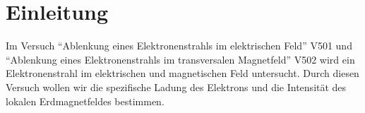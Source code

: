 \section{Einleitung}

Im Versuch \enquote{Ablenkung eines Elektronenstrahls im elektrischen Feld} V501 und \enquote{Ablenkung eines Elektronenstrahls im transversalen Magnetfeld} V502 wird ein Elektronenstrahl im elektrischen und magnetischen Feld untersucht. Durch diesen Versuch wollen wir die spezifische Ladung des Elektrons und die Intensität des lokalen Erdmagnetfeldes bestimmen.
